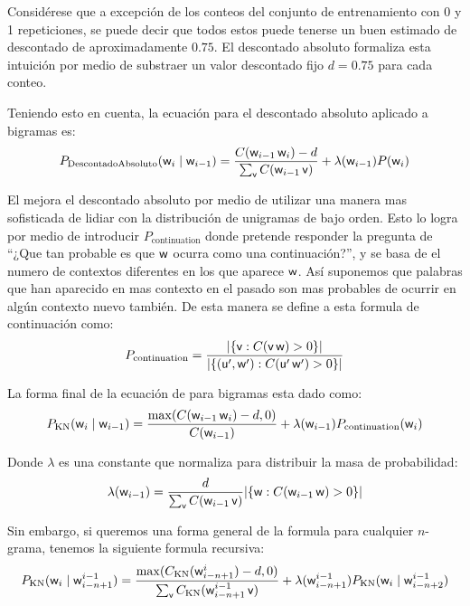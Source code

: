 Considérese que a excepción de los conteos del conjunto de entrenamiento con 0 y 1 repeticiones, se puede decir que todos estos puede tenerse un buen estimado de descontado de aproximadamente $0.75$. El descontado absoluto formaliza esta intuición por medio de substraer un valor descontado fijo $d=0.75$ para cada conteo.

Teniendo esto en cuenta, la ecuación para el descontado absoluto aplicado a bigramas es:
\begin{equation}
  P_{\mathrm{Descontado Absoluto}}({\mathit{\mathsf{w}}}_i \mid {\mathit{\mathsf{w}}}_{i-1}) = \frac{C({\mathit{\mathsf{w}}}_{i-1} \, {\mathit{\mathsf{w}}}_i) - d}{\sum_{{\mathit{\mathsf{v}}}} C({\mathit{\mathsf{w}}}_{i-1} \, {\mathit{\mathsf{v}}})} + \lambda({\mathit{\mathsf{w}}}_{i-1}) P({\mathit{\mathsf{w}}}_i)
\end{equation}

El  mejora el descontado absoluto por medio de utilizar una manera mas sofisticada de lidiar con la distribución de unigramas de bajo orden. Esto lo logra por medio de introducir $P_{\mathrm{continuation}}$ donde pretende responder la pregunta de ``¿Que tan probable es que ${\mathit{\mathsf{w}}}$ ocurra como una continuación?'', y se basa de el numero de contextos diferentes en los que aparece ${\mathit{\mathsf{w}}}$. Así suponemos que palabras que han aparecido en mas contexto en el pasado son mas probables de ocurrir en algún contexto nuevo también. De esta manera se define a esta formula de continuación como:
\begin{equation}
  P_{\mathrm{continuation}}  = \frac{ |\{ {\mathit{\mathsf{v}}} : C({\mathit{\mathsf{v}}} \, {\mathit{\mathsf{w}}}) > 0 \}| }{ | \{ ({\mathit{\mathsf{u}}}^{\prime}, {\mathit{\mathsf{w}}}^{\prime}) : C({\mathit{\mathsf{u}}}^{\prime} \, {\mathit{\mathsf{w}}}^{\prime}) > 0 \} | }
\end{equation}

La forma final de la ecuación de  para bigramas esta dado como:
\begin{equation}
  P_{\mathrm{KN}}({\mathit{\mathsf{w}}}_i \mid {\mathit{\mathsf{w}}}_{i-1}) = \frac{ \max(C({\mathit{\mathsf{w}}}_{i-1} \, {\mathit{\mathsf{w}}}_{i}) -d, 0) }{C({\mathit{\mathsf{w}}}_{i-1})} + \lambda({\mathit{\mathsf{w}}}_{i-1}) P_{\mathrm{continuation}}({\mathit{\mathsf{w}}}_i)
\end{equation}

Donde $\lambda$ es una constante que normaliza para distribuir la masa de probabilidad:
\begin{equation}
  \lambda({\mathit{\mathsf{w}}}_{i-1}) = \frac{d}{ \sum_{{\mathit{\mathsf{v}}}} C({\mathit{\mathsf{w}}}_{i-1} \, {\mathit{\mathsf{v}}}) } | \{ {\mathit{\mathsf{w}}} : C({\mathit{\mathsf{w}}}_{i-1} \, {\mathit{\mathsf{w}}}) > 0 \} |
\end{equation}

Sin embargo, si queremos una forma general de la formula para cualquier $n$-grama, tenemos la siguiente formula recursiva:
\begin{equation}
  P_{\mathrm{KN}}({\mathit{\mathsf{w}}}_i \mid {\mathit{\mathsf{w}}}_{i-n+1}^{i-1}) = \frac{ \max(C_{\mathrm{KN}}({\mathit{\mathsf{w}}}_{i-n+1}^{i}) -d, 0) }{\sum_{\mathit{\mathsf{v}}} C_{\mathrm{KN}}({\mathit{\mathsf{w}}}_{i-n+1}^{i-1} \, {\mathit{\mathsf{v}}})} + \lambda({\mathit{\mathsf{w}}}_{i-n+1}^{i-1}) P_{\mathrm{KN}}({\mathit{\mathsf{w}}}_i \mid {\mathit{\mathsf{w}}}_{i-n+2}^{i-1})
\end{equation}

